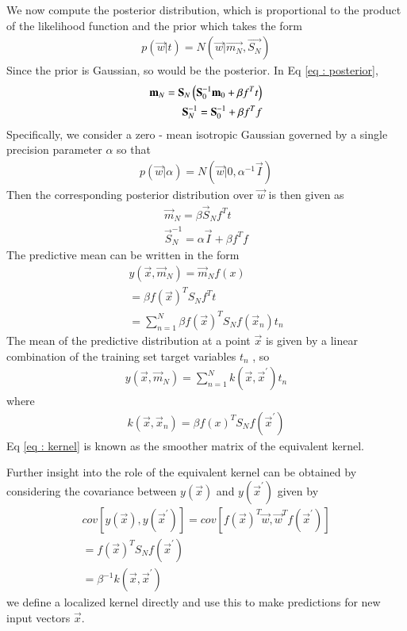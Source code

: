 \documentclass[journal,12pt,twocolumn]{IEEEtran}
\begin{document}
We now compute the posterior distribution, which is proportional to the product of the likelihood function and the prior which takes the form
\begin{align}
    p(\vec{w} | t) = N(\vec{w} | \vec{m_{N}},\vec{S_{N}}) \label{eq : posterior}
\end{align}
Since the prior is Gaussian, so would be the posterior.
In Eq \eqref{eq : posterior},
\begin{align}
       \mathbf{m}_{N} = \mathbf{S}_{N}\left(\mathbf{S}_{0}^{-1}\mathbf{m}_{0} + \beta f^T t\right)\\
       \mathbf{S}_{N}^{-1} = \mathbf{S}_{0}^{-1} + \beta f^{T} f
\end{align}
Specifically, we consider a zero - mean isotropic Gaussian governed by a single precision parameter $\alpha$ so that
\begin{align}
    p(\vec{w} | \alpha) = N(\vec{w} | 0, \alpha^{-1} \vec{I})
\end{align}
Then the corresponding posterior distribution over $\vec{w}$ is then given as
\begin{align}
    \vec{m}_{N} = \beta\vec{S}_{N} f^T t \label{eq : mean}\\
    \vec{S}_{N}^{-1} = \alpha \vec{I} + \beta f^{T} f
\end{align}
The predictive mean can be written in the form
\begin{multline}
     y(\vec{x},\vec{m}_{N}) = \vec{m}_{N} f(x)\\
        = \beta f(\vec{x})^{T} S_{N} f^{T} t \\
        = \sum_{n=1}^{N} \beta f(\vec{x})^{T} S_{N} f(\vec{x}_{n}) t_{n}
\end{multline}
The mean of the predictive distribution at a point $\vec{x}$ is given by a linear combination of the training set target variables $t_{n}$ , so
\begin{align}
    y(\vec{x},\vec{m}_{N}) = \sum_{n=1}^{N} k(\vec{x},\vec{x}^{'}) t_{n}
\end{align}
where
\begin{align}
    k(\vec{x},\vec{x}_{n}) = \beta f(x)^{T} S_{N} f(\vec{x}^{'}) \label{eq : kernel}
\end{align}
Eq \eqref{eq : kernel} is known as the smoother matrix of the equivalent kernel.

Further insight into the role of the equivalent kernel can be obtained by considering the covariance between $y(\vec{x})$ and $y(\vec{x}^{'})$ given by
\begin{align}
    cov[y(\vec{x}),y(\vec{x}^{'})] = cov[f(\vec{x})^{T}\vec{w}, \vec{w}^{T}f(\vec{x}^{'})]\\
         = f(\vec{x})^{T} S_{N} f(\vec{x}^{'})\\
         = \beta^{-1}k(\vec{x},\vec{x}^{'})
\end{align}
we define a localized kernel directly and use this to make predictions for new input vectors $\vec{x}$.
\end{document}
